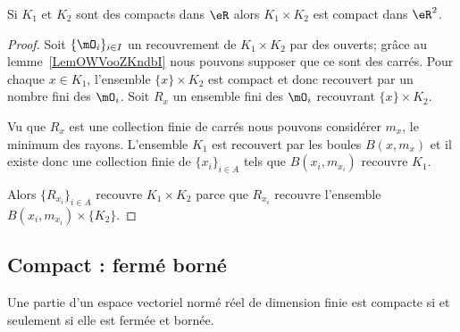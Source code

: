 \begin{lemma}\label{LemCKBooXkwkte}
    Si \( K_1\) et \( K_2\) sont des compacts dans \( \eR\) alors \( K_1\times K_2\) est compact dans \( \eR^2\).
\end{lemma}

\begin{proof}
    Soit \( \{ \mO_i \}_{i\in I}\) un recouvrement de \( K_1\times K_2\) par des ouverts; grâce au lemme~\ref{LemOWVooZKndbI} nous pouvons supposer que ce sont des carrés. Pour chaque \( x\in K_1\), l'ensemble \( \{ x \}\times K_2\) est compact et donc recouvert par un nombre fini des \( \mO_i\). Soit \( R_x\) un ensemble fini des \( \mO_i\) recouvrant \( \{ x \}\times K_2\).

    Vu que \( R_x\) est une collection finie de carrés nous pouvons considérer \( m_x\), le minimum des rayons. L'ensemble \( K_1\) est recouvert par les boules \( B(x,m_x)\) et il existe donc une collection finie de \( \{ x_i \}_{i\in A}\) tels que \( B(x_i,m_{x_i})\) recouvre \( K_1\).

    Alors \( \{ R_{x_i} \}_{i\in A}\) recouvre \( K_1\times K_2\) parce que \( R_{x_i}\) recouvre l'ensemble \( B(x_i,m_{x_i})\times \{ K_2 \}\).
\end{proof}

\subsection{Compact : fermé borné}

\begin{theorem} \label{ThoXTEooxFmdI}
    Une partie d'un espace vectoriel normé réel de dimension finie est compacte si et seulement si elle est fermée et bornée.
\end{theorem}

